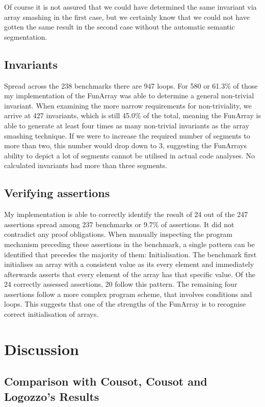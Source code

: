 \noindent Of course it is not assured that we could have determined the same invariant via array smashing in the first case, but we certainly know that we could not have gotten the same result in the second case without the automatic semantic segmentation.


\subsection{Invariants}

Spread across the 238 benchmarks there are 947 loops. For 580 or 61.3\% of those my implementation of the FunArray was able to determine a general non-trivial invariant. When examining the more narrow requirements for non-triviality, we arrive at 427 invariants, which is still 45.0\% of the total, meaning the FunArray is able to generate at least four times as many non-trivial invariants as the array smashing technique. If we were to increase the required number of segments to more than two, this number would drop down to 3, suggesting the FunArrays ability to depict a lot of segments cannot be utilised in actual code analyses. No calculated invariants had more than three segments.

\subsection{Verifying assertions}

My implementation is able to correctly identify the result of 24 out of the 247 assertions spread among 237 benchmarks or 9.7\% of assertions. It did not contradict any proof obligations. When manually inspecting the program mechanism preceding these assertions in the benchmark, a single pattern can be identified that precedes the majority of them: Initialisation. The benchmark first initialises an array with a consistent value as its every element and immediately afterwards asserts that every element of the array has that specific value. Of the 24 correctly assessed assertions, 20 follow this pattern. The remaining four assertions follow a more complex program scheme, that involves conditions and loops. This suggests that one of the strengths of the FunArray is to recognise correct initialisation of arrays.



\section{Discussion}
\subsection{Comparison with Cousot, Cousot and Logozzo's Results}

